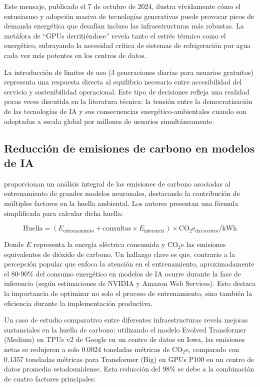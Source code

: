 Este mensaje, publicado el 7 de octubre de 2024, ilustra vívidamente cómo el entusiasmo y adopción masiva de tecnologías generativas puede provocar picos de demanda energética que desafían incluso las infraestructuras más robustas. La metáfora de ``GPUs derritiéndose'' revela tanto el estrés térmico como el energético, subrayando la necesidad crítica de sistemas de refrigeración por agua cada vez más potentes en los centros de datos.

La introducción de límites de uso (3 generaciones diarias para usuarios gratuitos) representa una respuesta directa al equilibrio necesario entre accesibilidad del servicio y sostenibilidad operacional. Este tipo de decisiones refleja una realidad pocas veces discutida en la literatura técnica: la tensión entre la democratización de las tecnologías de IA y sus consecuencias energético-ambientales cuando son adoptadas a escala global por millones de usuarios simultáneamente.

\subsection{Reducción de emisiones de carbono en modelos de IA}

\textcite{patterson2021carbon} proporcionan un análisis integral de las emisiones de carbono asociadas al entrenamiento de grandes modelos neuronales, destacando la contribución de múltiples factores en la huella ambiental. Los autores presentan una fórmula simplificada para calcular dicha huella:

\begin{equation}
\text{Huella} = (E_{\text{entrenamiento}} + \text{consultas} \times E_{\text{inferencia}}) \times \text{CO}_2\text{e}_{\text{datacentro}}/\text{kWh}
\end{equation}

Donde $E$ representa la energía eléctrica consumida y $\text{CO}_2\text{e}$ las emisiones equivalentes de dióxido de carbono. Un hallazgo clave es que, contrario a la percepción popular que enfoca la atención en el entrenamiento, aproximadamente el 80-90\% del consumo energético en modelos de IA ocurre durante la fase de inferencia (según estimaciones de NVIDIA y Amazon Web Services). Esto destaca la importancia de optimizar no solo el proceso de entrenamiento, sino también la eficiencia durante la implementación productiva.

Un caso de estudio comparativo entre diferentes infraestructuras revela mejoras sustanciales en la huella de carbono: utilizando el modelo Evolved Transformer (Medium) en TPUs v2 de Google en un centro de datos en Iowa, las emisiones netas se redujeron a solo 0.0024 toneladas métricas de CO$_2$e, comparado con 0.1357 toneladas métricas para Transformer (Big) en GPUs P100 en un centro de datos promedio estadounidense. Esta reducción del 98\% se debe a la combinación de cuatro factores principales:

